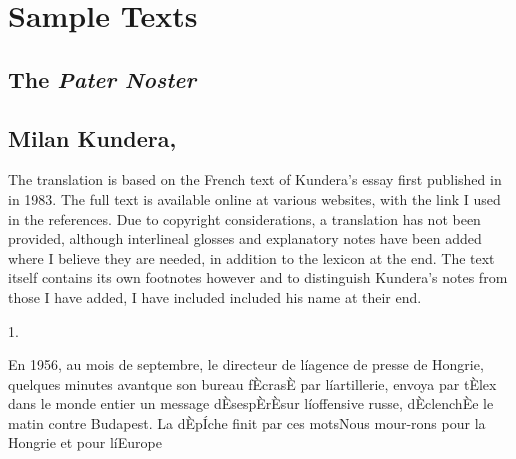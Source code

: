 \chapter{Sample Texts}

\section{The \emph{Pater Noster}}

\section{Milan Kundera, }

{\small
The translation is based on the French text of Kundera's essay  first published in  in 1983. The full text is available online at various websites, with the link I used in the references. Due to copyright considerations, a translation has not been provided, although interlineal glosses and explanatory notes have been added where  I believe they are needed, in addition to the lexicon at the end. The text itself contains its own footnotes however and to distinguish Kundera's notes from those I have added, I have included included his name at their end.
}

\begin{center}1.\end{center}
En 1956, au mois de septembre, le directeur de líagence de presse de Hongrie, quelques minutes avantque son bureau fÈcrasÈ par líartillerie, envoya par tÈlex dans le monde entier un message dÈsespÈrÈsur líoffensive russe, dÈclenchÈe le matin contre Budapest. La dÈpÍche finit par ces motsNous mour-rons pour la Hongrie et pour líEurope
